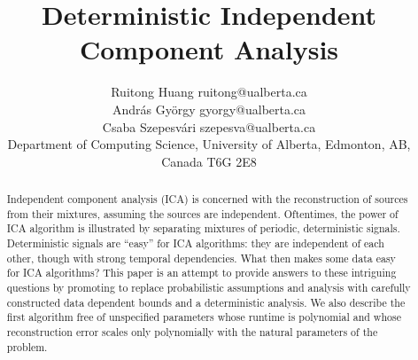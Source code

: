 \documentclass[11pt]{article}
\title{Deterministic Independent Component Analysis}
\author{\name Ruitong Huang \email ruitong@ualberta.ca \\
\name Andr\'as Gy\"orgy \email gyorgy@ualberta.ca \\
\name Csaba Szepesv\'ari \email szepesva@ualberta.ca \\
\addr Department of Computing Science, University of Alberta,
Edmonton, AB, Canada T6G 2E8 }
\begin{document}
 
\maketitle

\begin{abstract}
Independent component analysis (ICA) is concerned with the reconstruction of sources from their mixtures, assuming the sources are independent. 
Oftentimes, the power of ICA algorithm is illustrated by separating mixtures of periodic, deterministic signals.
Deterministic signals are ``easy'' for ICA algorithms: they are independent of each other, though with strong temporal dependencies.
What then makes some data easy for ICA algorithms?
This paper is an attempt to provide answers to these intriguing questions by promoting to replace probabilistic assumptions
and analysis with carefully constructed data dependent bounds and a deterministic analysis.
We also describe the first algorithm free of unspecified parameters whose runtime is polynomial and whose
reconstruction error scales only polynomially with the natural parameters of the problem. 
\end{abstract}
\end{document}
